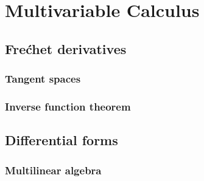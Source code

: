 \documentclass{../note}
\begin{document}
\section{}


\chapter{}





\part{Multivariable Calculus}
\chapter{Fre\'chet derivatives}
\section{Tangent spaces}
\begin{prb}

\end{prb}

\section{Inverse function theorem}






\chapter{Differential forms}
\section{Multilinear algebra}

\begin{prb}
\end{prb}

\begin{prb}
\end{prb}
\end{document}
